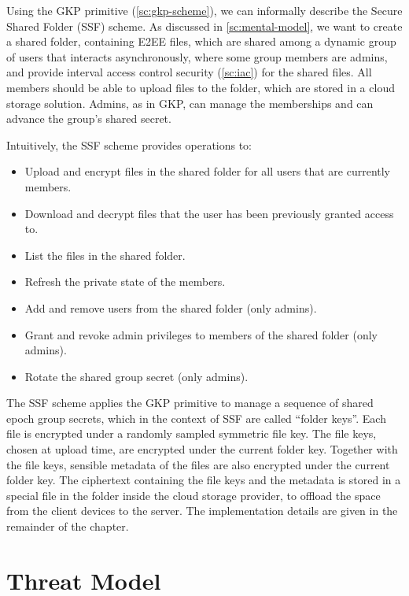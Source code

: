 Using the GKP primitive (\cref{sc:gkp-scheme}), 
we can informally describe the Secure Shared Folder (SSF) scheme.
As discussed in \cref{sc:mental-model}, we want to create 
a shared folder, containing E2EE files, which are shared
among a dynamic group of users that interacts asynchronously, where
some group members are admins, and provide interval access control security (\cref{sc:iac}) 
for the shared files. 
All members should be able to
upload files to the folder, which are stored
in a cloud storage solution. 
Admins, as in GKP, can manage the
memberships and can advance the group's shared secret.

Intuitively, the SSF scheme provides operations to:
\begin{itemize}
    \item Upload and encrypt files in the shared folder for all users that
    are currently members.
    \item Download and decrypt files that the user has been previously granted access to. 
    \item List the files in the shared folder.
    \item Refresh the private state of the members.
    \item Add and remove users from the shared folder (only admins).
    \item Grant and revoke admin privileges to members of the shared folder (only admins).
    \item Rotate the shared group secret (only admins).
\end{itemize}

The SSF scheme applies the GKP primitive to manage a sequence
of shared epoch group secrets, which in the context of SSF are called
``folder keys''. 
Each file is encrypted under a randomly sampled symmetric file key.
The file keys, chosen at upload time, are encrypted under the current
folder key. Together with the file keys, sensible metadata of the files
are also encrypted under the current folder key.
The ciphertext containing the file keys and the metadata is stored
in a special file in the folder inside the cloud storage provider,
to offload the space from the client devices to the server.
The implementation details are given in the remainder of the chapter.

\section{Threat Model}\label{sc:threat-model}

